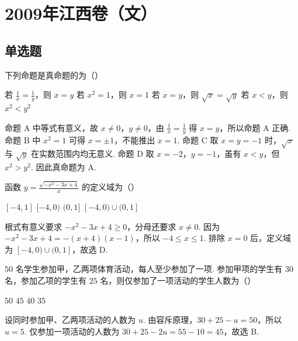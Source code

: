 \chapter{2009年江西卷（文）}

\section{单选题}

\begin{problem}
下列命题是真命题的为（\quad）

\choices
    {若 \(\frac{1}{x}=\frac{1}{y}\)，则 \(x=y\)}
    {若 \(x^{2}=1\)，则 \(x=1\)}
    {若 \(x=y\)，则 \(\sqrt{x}=\sqrt{y}\)}
    {若 \(x<y\)，则 \(x^2<y^2\)}
\begin{solution}
命题 A 中等式有意义，故 \(x\neq0\)，\(y\neq0\)，由 \(\frac{1}{x}=\frac{1}{y}\) 得 \(x=y\)，所以命题 A 正确. 命题 B 中 \(x^{2}=1\) 可得 \(x=\pm1\)，不能推出 \(x=1\). 命题 C 取 \(x=y=-1\) 时，\(\sqrt{x}\) 与 \(\sqrt{y}\) 在实数范围内均无意义. 命题 D 取 \(x=-2\)，\(y=-1\)，虽有 \(x<y\)，但 \(x^{2}>y^{2}\). 因此真命题为 A.
\end{solution}
\end{problem}

\begin{problem}
函数 \( y = \frac{\sqrt{-x^2 - 3x + 4}}{x} \) 的定义域为（\quad）

\choices
    {\([-4, 1]\)}
    {\([-4, 0)\)}
    {\( (0,1] \)}
    {\([-4,0)\cup (0,1]\)}
\begin{solution}
根式有意义要求 \(-x^{2}-3x+4\geqslant0\)，分母还要求 \(x\neq0\). 因为
\(-x^{2}-3x+4=-(x+4)(x-1)\)，所以 \(-4\leqslant x\leqslant1\). 排除 \(x=0\) 后，定义域为 \([-4,0)\cup(0,1]\)，故选 D.
\end{solution}
\end{problem}

\begin{problem}
\(50\) 名学生参加甲，乙两项体育活动，每人至少参加了一项. 参加甲项的学生有 \(30\) 名，参加乙项的学生有 \(25\) 名，则仅参加了一项活动的学生人数为（\quad）

\choices
    {\(50\)}
    {\(45\)}
    {\(40\)}
    {\(35\)}
\begin{solution}
设同时参加甲、乙两项活动的人数为 \(u\). 由容斥原理，\(30+25-u=50\)，所以 \(u=5\). 仅参加一项活动的人数为
\(30+25-2u=55-10=45\)，故选 B.
\end{solution}
\end{problem}

